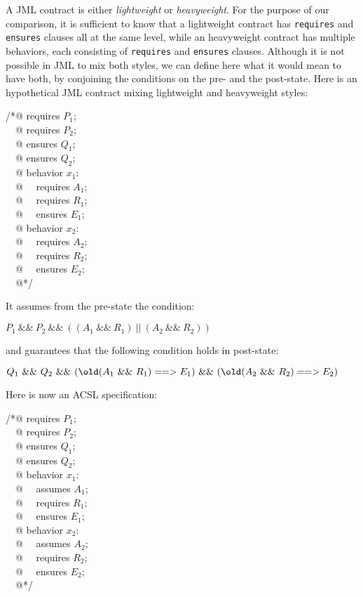 A JML contract is either \emph{lightweight} or \emph{heavyweight}.
For the purpose of our comparison, it is sufficient to know that a
lightweight contract has \verb|requires| and \verb|ensures| clauses
all at the same level, while an heavyweight contract has multiple
behaviors, each consisting of \verb|requires| and \verb|ensures|
clauses. Although it is not possible in JML to mix both styles, we can
define here what it would mean to have both, by conjoining the
conditions on the pre- and the post-state.
Here is an hypothetical JML contract mixing lightweight and
heavyweight styles:
\begin{flushleft}\ttfamily
/*@ requires $P_1$; \\
~~@ requires $P_2$; \\
~~@ ensures  $Q_1$; \\
~~@ ensures  $Q_2$; \\
~~@ behavior $x_1$: \\
~~@ ~~requires $A_1$; \\
~~@ ~~requires $R_1$; \\
~~@ ~~ensures $E_1$; \\
~~@ behavior $x_2$: \\
~~@ ~~requires $A_2$; \\
~~@ ~~requires $R_2$; \\
~~@ ~~ensures $E_2$; \\
~~@*/
\end{flushleft}
It assumes from the pre-state the condition:
\begin{center}
{\ttfamily $P_1 ~\&\&~ P_2 ~\&\&~ ((A_1 ~\&\&~ R_1) ~||~ (A_2 ~\&\&~ R_2))$}
\end{center}
and guarantees that the following condition holds in post-state:
\begin{center}
{\ttfamily $Q_1 ~\&\&~ Q_2 ~\&\&~
  (\texttt{{\textbackslash}old}(A_1 ~\&\&~ R_1) ==> E_1) ~\&\&~ (\texttt{{\textbackslash}old}(A_2 ~\&\&~ R_2) ==> E_2)$}
\end{center}


Here is now an ACSL specification:

\begin{flushleft}\ttfamily
/*@ requires $P_1$; \\
~~@ requires $P_2$; \\
~~@ ensures  $Q_1$; \\
~~@ ensures  $Q_2$; \\
~~@ behavior $x_1$: \\
~~@ ~~assumes $A_1$; \\
~~@ ~~requires $R_1$; \\
~~@ ~~ensures $E_1$; \\
~~@ behavior $x_2$: \\
~~@ ~~assumes $A_2$; \\
~~@ ~~requires $R_2$; \\
~~@ ~~ensures $E_2$; \\
~~@*/
\end{flushleft}

